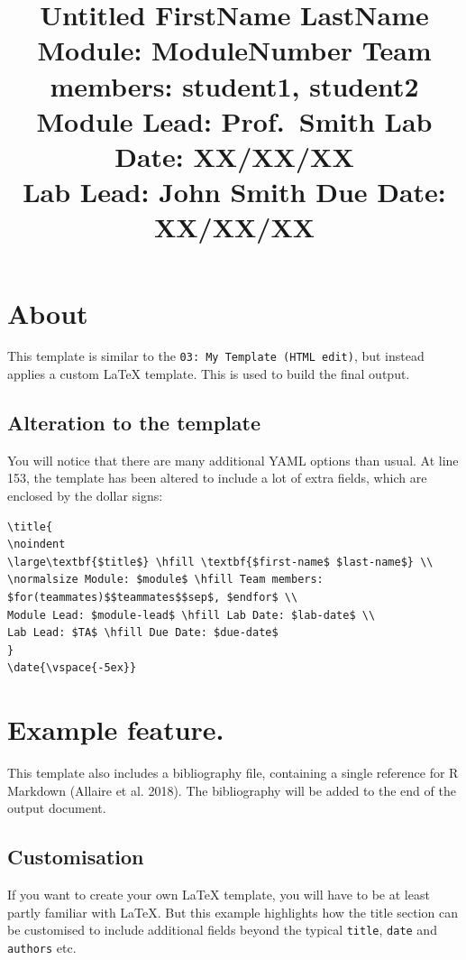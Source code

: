 \documentclass[11pt,a4paper,]{article}
\title{
\noindent
\large\textbf{Untitled} \hfill \textbf{FirstName LastName} \\
\normalsize Module: ModuleNumber \hfill Team members: student1, student2 \\
Module Lead: Prof.~Smith \hfill Lab Date: XX/XX/XX \\
Lab Lead: John Smith \hfill Due Date: XX/XX/XX
}
\date{\vspace{-5ex}}
\begin{document}
\maketitle





\section{About}\label{about}

This template is similar to the
\texttt{03:\ My\ Template\ (HTML\ edit)}, but instead applies a custom
LaTeX template. This is used to build the final output.

\subsection{Alteration to the
template}\label{alteration-to-the-template}

You will notice that there are many additional YAML options than usual.
At line 153, the template has been altered to include a lot of extra
fields, which are enclosed by the dollar signs:

\begin{verbatim}
\title{
\noindent
\large\textbf{$title$} \hfill \textbf{$first-name$ $last-name$} \\
\normalsize Module: $module$ \hfill Team members: $for(teammates)$$teammates$$sep$, $endfor$ \\
Module Lead: $module-lead$ \hfill Lab Date: $lab-date$ \\
Lab Lead: $TA$ \hfill Due Date: $due-date$
}
\date{\vspace{-5ex}}
\end{verbatim}

\section{Example feature.}\label{example-feature.}

This template also includes a bibliography file, containing a single
reference for R Markdown (Allaire et al. 2018). The bibliography will be
added to the end of the output document.

\subsection{Customisation}\label{customisation}

If you want to create your own LaTeX template, you will have to be at
least partly familiar with LaTeX. But this example highlights how the
title section can be customised to include additional fields beyond the
typical \texttt{title}, \texttt{date} and \texttt{authors} etc.
\end{document}
